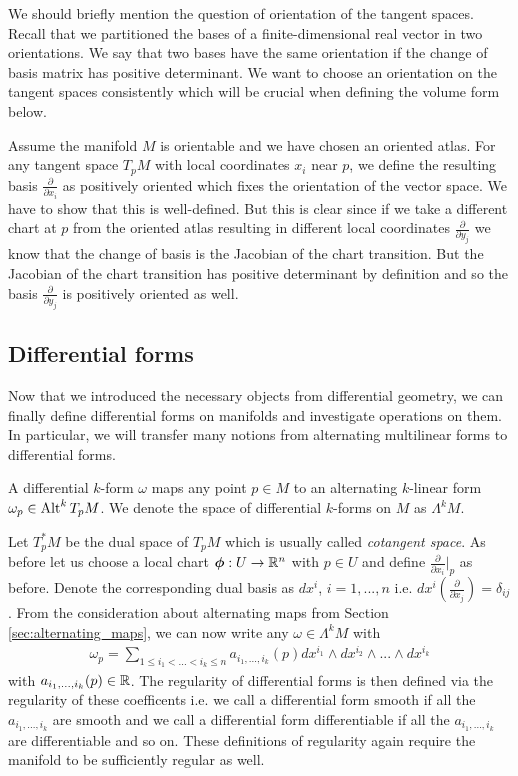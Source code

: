 \documentclass[../master_thesis.tex]{subfiles}
\begin{document}
We should briefly mention the question of orientation of the tangent spaces.
Recall that we partitioned the bases of a finite-dimensional real vector 
in two orientations. We say that two bases have the same 
orientation if the change of basis matrix has positive determinant.
We want to choose an orientation on the tangent spaces consistently which 
will be crucial when defining the volume form below.

Assume the manifold $M$ is orientable and we have chosen an oriented atlas.
For any tangent space $T_p M$ with local coordinates $x_i$ near $p$, 
we define the resulting basis $\frac{\partial}{\partial x_i}$ as positively
oriented which fixes the orientation of the vector space. We have to show 
that this is well-defined. But this is clear since if we take a different 
chart at $p$ from the oriented atlas resulting in different local coordinates 
$\frac{\partial}{\partial y_j}$
we know that the change of 
basis is the Jacobian of the chart transition. But the Jacobian of the 
chart transition has positive determinant by definition and so the basis 
$\frac{\partial}{\partial y_j}$ is positively oriented as well.

\subsection{Differential forms}\label{sec:differential_forms_subsection}
Now that we introduced the necessary objects from differential geometry, 
we can finally define differential forms on manifolds and investigate operations 
on them. In particular, we will transfer many notions from alternating 
multilinear forms to differential forms.

\begin{definition}
    A differential $k$-form $\omega$ maps any point $p \in M$ to an 
    alternating $k$-linear form $\omega_p \in {\text{Alt}^{k}\,T_p M}$.
    We denote the space of differential $k$-forms on $M$ as $\Lambda^k M$.
\end{definition}

Let $T_p^* M$ be the dual space of $T_p M$ which is usually called 
\textit{cotangent space}.
As before let us choose a local chart $\boldsymbol{\phi}: U \rightarrow \mathbb{R}^n$ with 
$p \in U$ and define $\frac{\partial}{\partial x_i}|_p$ as before. 
Denote the corresponding
dual basis as $dx^i$, $i = 1,...,n$ i.e. 
$dx^i(\frac{\partial}{\partial x_j}) = \delta_{ij}$. 
From the consideration about
alternating maps from Section \ref{sec:alternating_maps}, we can now write any 
$\omega \in \Lambda^k M$ with 
\begin{align*}
    \omega_p = \sum\limits_{1\leq i_1 < ... < i_k \leq n} 
        a_{i_1,...,i_k}(p) dx^{i_1} \wedge dx^{i_2} \wedge ... \wedge dx^{i_k}
\end{align*}
with $a_{i_1,...,i_k}(p) \in \mathbb{R}$. The regularity of differential forms 
is then defined via the regularity of these coefficents i.e. we call 
a differential form smooth if all the $a_{i_1,...,i_k}$ are smooth 
and we call a differential form differentiable if all the $a_{i_1,...,i_k}$
are differentiable and so on. These definitions of regularity again require 
the manifold to be sufficiently regular as well.
\end{document}
